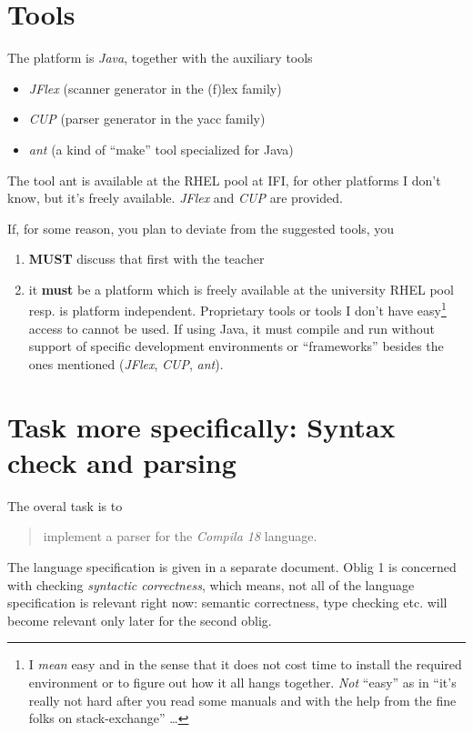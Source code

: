 \documentclass[11pt,freeform]{handout}[2014/08/13]
\begin{document}
\section{Tools}

The platform is \emph{Java}, together with the auxiliary tools

\begin{itemize}
\item \textsl{JFlex} (scanner generator in the (f)lex family)
\item \textsl{CUP} (parser generator in the yacc family)
\item \textsl{ant} (a kind of ``make'' tool specialized for Java)
\end{itemize}


The tool ant is available at the RHEL pool at IFI, for other platforms I
don't know, but it's freely available. \textsl{JFlex} and \textsl{CUP} are
provided.

If, for some reason, you plan to deviate from the suggested tools, you
\begin{enumerate}
\item \textbf{MUST} discuss that first with the teacher
\item it \textbf{must} be a platform which is freely available at the
  university RHEL pool resp. is  platform independent. Proprietary tools or
  tools I don't have easy\footnote{I \emph{mean} easy and in the sense that
    it does not cost time to install the required environment or to figure
    out how it all hangs together. \emph{Not} ``easy'' as in ``it's really
    not hard after you read some manuals and with the help from the fine
    folks on stack-exchange'' \ldots} access to cannot be used. If using Java, it
  must compile and run without support of specific development environments
  or ``frameworks'' besides the ones mentioned (\textsl{JFlex},
  \textsl{CUP}, \textsl{ant}).
\end{enumerate}



\section{Task more specifically: Syntax check and parsing}
\label{sec:task-more-spec}


The overal task is to 

\begin{quote}
  implement a parser for the \textsl{Compila 18} language.
\end{quote}
The language specification is given in a separate document. Oblig 1 is
concerned with checking \emph{syntactic correctness}, which means, not all
of the language specification is relevant right now: semantic correctness,
type checking etc. will become relevant only later for the second oblig.
\end{document}
